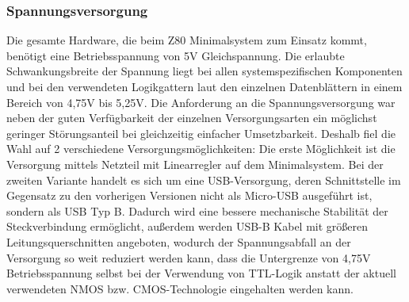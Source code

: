 \subsubsection{Spannungsversorgung}
Die gesamte Hardware, die beim Z80 Minimalsystem zum Einsatz kommt, benötigt eine Betriebsspannung von 5V Gleichspannung. Die erlaubte Schwankungsbreite der Spannung liegt bei allen systemspezifischen Komponenten und bei den verwendeten Logikgattern laut den einzelnen Datenblättern in einem Bereich von 4,75V bis 5,25V. Die Anforderung an die Spannungsversorgung war neben der guten Verfügbarkeit der einzelnen Versorgungsarten ein möglichst geringer Störungsanteil bei gleichzeitig einfacher Umsetzbarkeit. Deshalb fiel die Wahl auf 2 verschiedene Versorgungsmöglichkeiten: Die erste Möglichkeit ist die Versorgung mittels Netzteil mit Linearregler auf dem Minimalsystem. Bei der zweiten Variante handelt es sich um eine USB-Versorgung, deren Schnittstelle im Gegensatz zu den vorherigen Versionen nicht als Micro-USB ausgeführt ist, sondern als USB Typ B. Dadurch wird eine bessere mechanische Stabilität der Steckverbindung ermöglicht, außerdem werden USB-B Kabel mit größeren Leitungsquerschnitten angeboten, wodurch der Spannungsabfall an der Versorgung so weit reduziert werden kann, dass die Untergrenze von 4,75V Betriebsspannung selbst bei der Verwendung von TTL-Logik anstatt der aktuell verwendeten NMOS bzw. CMOS-Technologie eingehalten werden kann.


